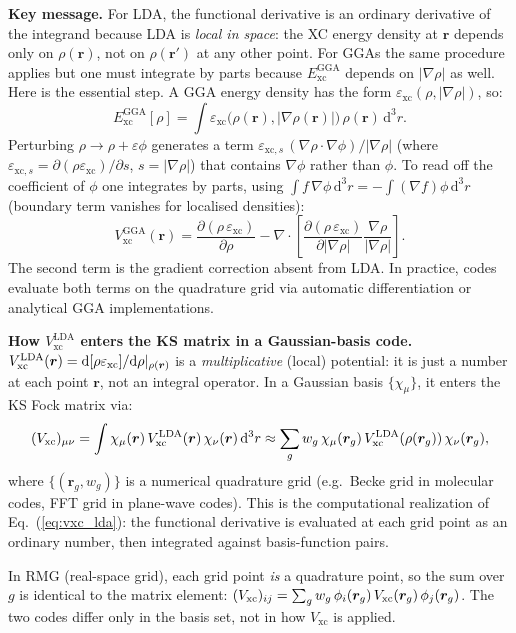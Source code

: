 \documentclass[12pt,letterpaper]{article}
\newcommand{\dd}{\mathrm{d}}
\newcommand{\Vxc}{V_{\mathrm{xc}}}
\newcommand{\Exc}{E_{\mathrm{xc}}}
\theoremstyle{definition}
\begin{document}
\noindent\textbf{Key message.}
For LDA, the functional derivative is an ordinary derivative of the integrand
because LDA is \emph{local in space}: the XC energy density at $\bm{r}$
depends only on $\rho(\bm{r})$, not on $\rho(\bm{r}')$ at any other point.
For GGAs the same procedure applies but one must integrate by parts
because $\Exc^{\mathrm{GGA}}$ depends on $|\nabla\rho|$ as well.
Here is the essential step.
A GGA energy density has the form
$\varepsilon_{\mathrm{xc}}(\rho,|\nabla\rho|)$, so:
\begin{equation}
  \Exc^{\mathrm{GGA}}[\rho]
  = \int \varepsilon_{\mathrm{xc}}\!\bigl(\rho(\bm{r}),|\nabla\rho(\bm{r})|\bigr)
    \,\rho(\bm{r})\,\dd^3r.
\end{equation}
Perturbing $\rho\to\rho+\varepsilon\phi$ generates a term
$\varepsilon_{\mathrm{xc},s}\,(\nabla\rho\cdot\nabla\phi)/|\nabla\rho|$
(where $\varepsilon_{\mathrm{xc},s} = \partial(\rho\varepsilon_{\mathrm{xc}})/\partial s$,
$s=|\nabla\rho|$) that contains $\nabla\phi$ rather than $\phi$.
To read off the coefficient of $\phi$ one integrates by parts,
using $\int f\,\nabla\phi\,\dd^3r = -\int(\nabla f)\phi\,\dd^3r$
(boundary term vanishes for localised densities):
\begin{equation}
  \Vxc^{\mathrm{GGA}}(\bm{r})
  = \frac{\partial(\rho\,\varepsilon_{\mathrm{xc}})}{\partial\rho}
  - \nabla\cdot\left[
      \frac{\partial(\rho\,\varepsilon_{\mathrm{xc}})}{\partial|\nabla\rho|}
      \frac{\nabla\rho}{|\nabla\rho|}
    \right].
  \label{eq:vxc_gga}
\end{equation}
The second term is the gradient correction absent from LDA.
In practice, codes evaluate both terms on the quadrature grid via
automatic differentiation or analytical GGA implementations.

\begin{insight}
\textbf{How $V_\text{xc}^\text{LDA}$ enters the KS matrix in a Gaussian-basis code.}
$V_\text{xc}^\text{LDA}(\bm{r}) = \dd[\rho\varepsilon_{\rm xc}]/\dd\rho|_{\rho(\bm{r})}$
is a \emph{multiplicative} (local) potential: it is just a number at each
point $\bm{r}$, not an integral operator.
In a Gaussian basis $\{\chi_\mu\}$, it enters the KS Fock matrix via:
\begin{equation}
  (V_{\rm xc})_{\mu\nu}
  = \int \chi_\mu(\bm{r})\,V_\text{xc}^{\rm LDA}(\bm{r})\,\chi_\nu(\bm{r})
    \,\dd^3r
  \approx \sum_g w_g\,\chi_\mu(\bm{r}_g)\,V_\text{xc}^{\rm LDA}(\rho(\bm{r}_g))
    \,\chi_\nu(\bm{r}_g),
  \label{eq:vxc_matrix}
\end{equation}
where $\{(\bm{r}_g, w_g)\}$ is a numerical quadrature grid (e.g.\ Becke
grid in molecular codes, FFT grid in plane-wave codes).
This is the computational realization of Eq.~(\ref{eq:vxc_lda}): the
functional derivative is evaluated at each grid point as an ordinary
number, then integrated against basis-function pairs.

In RMG (real-space grid), each grid point \emph{is} a quadrature point,
so the sum over $g$ is identical to the matrix element:
$(V_{\rm xc})_{ij} = \sum_g w_g\,\phi_i(\bm{r}_g)\,V_\text{xc}(\bm{r}_g)\,\phi_j(\bm{r}_g)$.
The two codes differ only in the basis set, not in how $V_\text{xc}$ is applied.
\end{insight}
\end{document}
